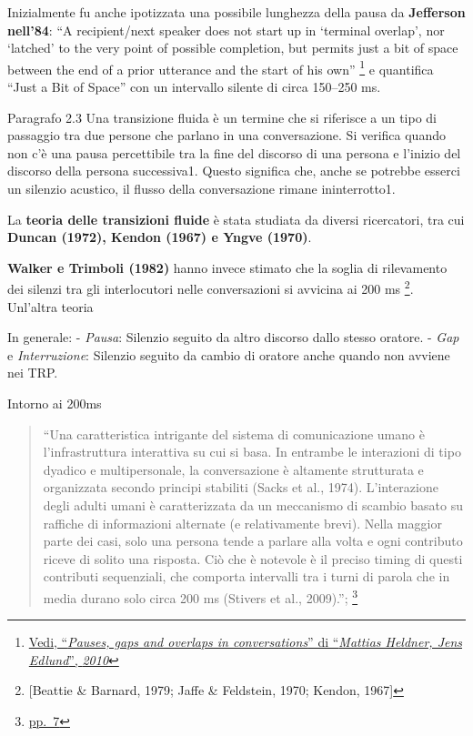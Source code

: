 \documentclass[
]{article}
\begin{document}
Inizialmente fu anche ipotizzata una possibile lunghezza della pausa da \textbf{Jefferson nell'84}: ``A recipient/next speaker does not start up in `terminal overlap', nor `latched' to the very point of possible completion, but permits just a bit of space between the end of a prior utterance and the start of his own'' \footnote{\href{DOC/1-s2.0-S0095447010000628-main.pdf}{Vedi, ``\emph{Pauses, gaps and overlaps in conversations}'' di ``\emph{Mattias Heldner, Jens Edlund}'', \emph{2010}}} e quantifica ``Just a Bit of Space'' con un intervallo silente di circa 150--250 ms.

Paragrafo 2.3 Una transizione fluida è un termine che si riferisce a un tipo di passaggio tra due persone che parlano in una conversazione. Si verifica quando non c'è una pausa percettibile tra la fine del discorso di una persona e l'inizio del discorso della persona successiva1. Questo significa che, anche se potrebbe esserci un silenzio acustico, il flusso della conversazione rimane ininterrotto1.

La \textbf{teoria delle transizioni fluide} è stata studiata da diversi ricercatori, tra cui \textbf{Duncan (1972), Kendon (1967) e Yngve (1970)}.

\textbf{Walker e Trimboli (1982)} hanno invece stimato che la soglia di rilevamento dei silenzi tra gli interlocutori nelle conversazioni si avvicina ai 200 ms \footnote{{[}Beattie \& Barnard, 1979; Jaffe \& Feldstein, 1970; Kendon, 1967{]}}. Unl'altra teoria

In generale: - \emph{Pausa}: Silenzio seguito da altro discorso dallo stesso oratore. - \emph{Gap} e \emph{Interruzione}: Silenzio seguito da cambio di oratore anche quando non avviene nei TRP.

Intorno ai 200ms

\begin{quote}
``Una caratteristica intrigante del sistema di comunicazione umano è l'infrastruttura interattiva su cui si basa. In entrambe le interazioni di tipo dyadico e multipersonale, la conversazione è altamente strutturata e organizzata secondo principi stabiliti (Sacks et al., 1974). L'interazione degli adulti umani è caratterizzata da un meccanismo di scambio basato su raffiche di informazioni alternate (e relativamente brevi). Nella maggior parte dei casi, solo una persona tende a parlare alla volta e ogni contributo riceve di solito una risposta. Ciò che è notevole è il preciso timing di questi contributi sequenziali, che comporta intervalli tra i turni di parola che in media durano solo circa 200 ms (Stivers et al., 2009).''; \footnote{\href{DOC/608110.pdf}{pp.~7}}
\end{quote}
\end{document}
